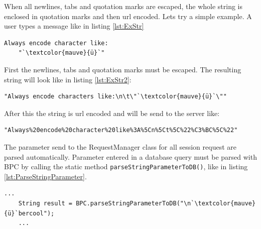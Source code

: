 \documentclass[12pt,a4paper,oneside]{report}
\newcommand{\code}[1]{\lstinline{#1}}
\begin{document}
When all newlines, tabs and quotation marks are escaped, the whole string is enclosed in quotation marks and then url encoded.
Lets try a simple example. A user types a message like in listing \ref{lst:ExStr}

\begin{lstlisting}[caption=Example string, label=lst:ExStr]
Always encode character like:
	"`\textcolor{mauve}{ü}`"
\end{lstlisting}

First the newlines, tabs and quotation marks must be escaped. The resulting string will look like in listing \ref{lst:ExStr2}:

\begin{lstlisting}[caption=Escaped characters, label=lst:ExStr2]
"Always encode characters like:\n\t\"`\textcolor{mauve}{ü}`\""
\end{lstlisting}

After this the string is url encoded and will be send to the server like:

\begin{lstlisting}[caption=Url encoded string, label=lst:ExStr3]
"Always%20encode%20character%20like%3A%5Cn%5Ct%5C%22%C3%BC%5C%22"
\end{lstlisting}

The parameter send to the RequestManager class for all session request are parsed automatically. Parameter entered in a database query must be parsed with BPC by calling the static method \code{parseStringParameterToDB()}, like in listing \ref{lst:ParseStringParameter}.
\begin{lstlisting}[caption=Parse a string parameter, label=lst:ParseStringParameter]
	...
	String result = BPC.parseStringParameterToDB("\n`\textcolor{mauve}{ü}`bercool");
	...
\end{lstlisting}
\end{document}
